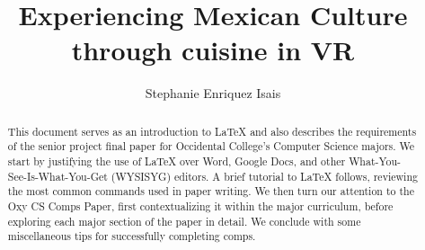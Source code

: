 \documentclass[12pt,twocolumn]{article}
\title{Experiencing Mexican Culture through cuisine in VR}
\author{Stephanie Enriquez Isais}
\affiliation{Occidental College}
\begin{document}
\maketitle

\begin{abstract}
    This document serves as an introduction to {\LaTeX} and also describes the requirements of the senior project final paper for Occidental College's Computer Science majors.
    We start by justifying the use of {\LaTeX} over Word, Google Docs, and other What-You-See-Is-What-You-Get (WYSISYG) editors.
    A brief tutorial to {\LaTeX} follows, reviewing the most common commands used in paper writing.
    We then turn our attention to the Oxy CS Comps Paper, first contextualizing it within the major curriculum, before exploring each major section of the paper in detail.
    We conclude with some miscellaneous tips for successfully completing comps.
\end{abstract}
\end{document}
